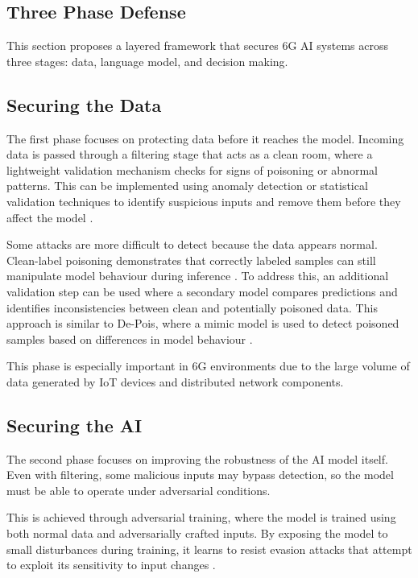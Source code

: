 \documentclass[letterpaper]{article} %
\begin{document}
\subsection {Three Phase Defense}

This section proposes a layered framework that secures 6G AI systems across three stages: data, language model, and decision making.

\subsection {Securing the Data}

The first phase focuses on protecting data before it reaches the model. Incoming data is passed through a filtering stage that acts as a clean room, where a lightweight validation mechanism checks for signs of poisoning or abnormal patterns. This can be implemented using anomaly detection or statistical validation techniques to identify suspicious inputs and remove them before they affect the model \cite{Chen_Zhang_Zhang_Wang_Liu_2021}.

Some attacks are more difficult to detect because the data appears normal. Clean-label poisoning demonstrates that correctly labeled samples can still manipulate model behaviour during inference \cite{NEURIPS2018_22722a34}. To address this, an additional validation step can be used where a secondary model compares predictions and identifies inconsistencies between clean and potentially poisoned data. This approach is similar to De-Pois, where a mimic model is used to detect poisoned samples based on differences in model behaviour \cite{Chen_Zhang_Zhang_Wang_Liu_2021}.

This phase is especially important in 6G environments due to the large volume of data generated by IoT devices and distributed network components.

\subsection {Securing the AI}

The second phase focuses on improving the robustness of the AI model itself. Even with filtering, some malicious inputs may bypass detection, so the model must be able to operate under adversarial conditions.

This is achieved through adversarial training, where the model is trained using both normal data and adversarially crafted inputs. By exposing the model to small disturbances during training, it learns to resist evasion attacks that attempt to exploit its sensitivity to input changes \cite{Catak_Catak_Moldsvor_2021}.
\end{document}
